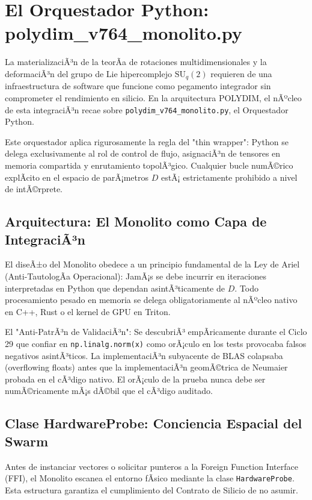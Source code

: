 ﻿\chapter{El Orquestador Python: polydim\_v764\_monolito.py}


La materializaciÃ³n de la teorÃ­a de rotaciones multidimensionales y la deformaciÃ³n del grupo de Lie hipercomplejo \(\text{SU}_q(2)\) requieren de una infraestructura de software que funcione como pegamento integrador sin comprometer el rendimiento en silicio. En la arquitectura POLYDIM, el nÃºcleo de esta integraciÃ³n recae sobre \texttt{polydim\_v764\_monolito.py}, el Orquestador Python.

Este orquestador aplica rigurosamente la regla del "thin wrapper": Python se delega exclusivamente al rol de control de flujo, asignaciÃ³n de tensores en memoria compartida y enrutamiento topolÃ³gico. Cualquier bucle numÃ©rico explÃ­cito en el espacio de parÃ¡metros \(D\) estÃ¡ estrictamente prohibido a nivel de intÃ©rprete.

\section{Arquitectura: El Monolito como Capa de IntegraciÃ³n}


El diseÃ±o del Monolito obedece a un principio fundamental de la Ley de Ariel (Anti-TautologÃ­a Operacional): JamÃ¡s se debe incurrir en iteraciones interpretadas en Python que dependan asintÃ³ticamente de \(D\). Todo procesamiento pesado en memoria se delega obligatoriamente al nÃºcleo nativo en C++, Rust o el kernel de GPU en Triton.

El "Anti-PatrÃ³n de ValidaciÃ³n": Se descubriÃ³ empÃ­ricamente durante el Ciclo 29 que confiar en \texttt{np.linalg.norm(x)} como orÃ¡culo en los tests provocaba falsos negativos asintÃ³ticos. La implementaciÃ³n subyacente de BLAS colapsaba (overflowing floats) antes que la implementaciÃ³n geomÃ©trica de Neumaier probada en el cÃ³digo nativo. El orÃ¡culo de la prueba nunca debe ser numÃ©ricamente mÃ¡s dÃ©bil que el cÃ³digo auditado.

\section{Clase HardwareProbe: Conciencia Espacial del Swarm}


Antes de instanciar vectores o solicitar punteros a la Foreign Function Interface (FFI), el Monolito escanea el entorno fÃ­sico mediante la clase \texttt{HardwareProbe}. Esta estructura garantiza el cumplimiento del Contrato de Silicio de no asumir.

